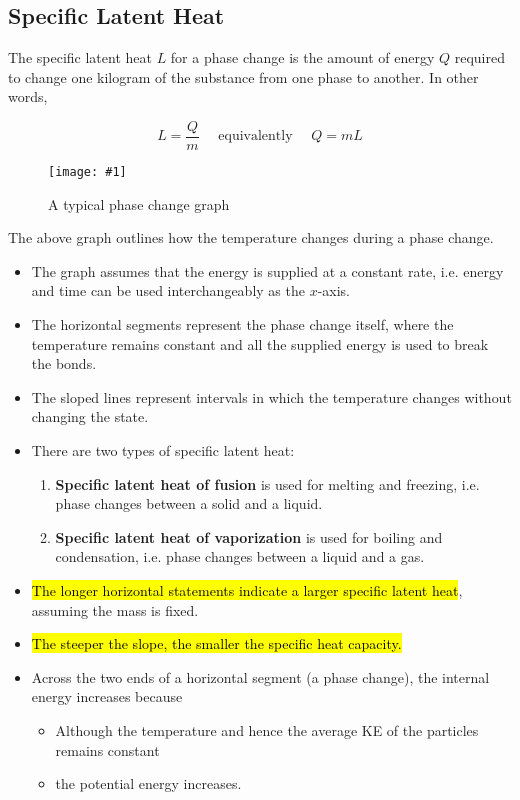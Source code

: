 \documentclass[a4paper,12pt]{article}
\newcommand{\img}[4]{\begin{center}
  \begin{figure}[H]
    \centering
    \texttt{[image: \#1]}
    \caption{#3}
    \label{fig:#4}
  \end{figure}
\end{center}}
\begin{document}
\subsection{Specific Latent Heat}

The specific latent heat $L$ for a phase change is the amount of energy $Q$ required to change one kilogram of the substance from one phase to another. In other words,

$$L = \dfrac{Q}{m} \quad \text{ equivalently } \quad Q = mL$$

\img{phasechangegraph}{0.65}{A typical phase change graph}{phase_change_graph}

The above graph outlines how the temperature changes during a phase change.
\begin{itemize}
  \item The graph assumes that the energy is supplied at a constant rate, i.e. energy and time can be used interchangeably as the $x$-axis.
  \item The horizontal segments represent the phase change itself, where the temperature remains constant and all the supplied energy is used to break the bonds.
  \item The sloped lines represent intervals in which the temperature changes without changing the state.
  \item There are two types of specific latent heat:
        \begin{enumerate}
          \item \textbf{Specific latent heat of fusion} is used for melting and freezing, i.e. phase changes between a solid and a liquid.
          \item \textbf{Specific latent heat of vaporization} is used for boiling and condensation, i.e. phase changes between a liquid and a gas.
        \end{enumerate}
  \item \hl{The longer horizontal statements indicate a larger specific latent heat}, assuming the mass is fixed.
  \item \hl{The steeper the slope, the smaller the specific heat capacity.}
  \item Across the two ends of a horizontal segment (a phase change), the internal energy increases because
        \begin{itemize}
          \item Although the temperature and hence the average KE of the particles remains constant
          \item the potential energy increases.
        \end{itemize}
\end{itemize}
\end{document}
